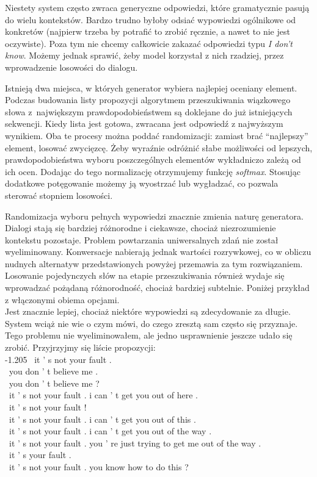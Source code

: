 Niestety system często zwraca generyczne odpowiedzi, które gramatycznie pasują do wielu kontekstów. Bardzo trudno byłoby odsiać wypowiedzi ogólnikowe od konkretów (najpierw trzeba by potrafić to zrobić ręcznie, a nawet to nie jest oczywiste). Poza tym nie chcemy całkowicie zakazać odpowiedzi typu \textit{I don't know}. Możemy jednak sprawić, żeby model korzystał z nich rzadziej, przez wprowadzenie losowości do dialogu.

Istnieją dwa miejsca, w których generator wybiera najlepiej oceniany element. Podczas budowania listy propozycji algorytmem przeszukiwania wiązkowego słowa z~największym prawdopodobieństwem są doklejane do już istniejących sekwencji. Kiedy lista jest gotowa, zwracana jest odpowiedź z najwyższym wynikiem. Oba te procesy można poddać randomizacji: zamiast brać ``najlepszy'' element, losować zwycięzcę. Żeby wyraźnie odróżnić słabe możliwości od lepszych, prawdopodobieństwa wyboru poszczególnych elementów wykładniczo zależą od ich ocen. Dodając do tego normalizację otrzymujemy funkcję \textit{softmax}. Stosując dodatkowe potęgowanie możemy ją wyostrzać lub wygładzać, co pozwala sterować stopniem losowości.

Randomizacja wyboru pełnych wypowiedzi znacznie zmienia naturę generatora. Dialogi stają się bardziej różnorodne i ciekawsze, chociaż niezrozumienie kontekstu pozostaje. Problem powtarzania uniwersalnych zdań nie został wyeliminowany. Konwersacje nabierają jednak wartości rozrywkowej, co w obliczu nudnych alternatyw przedstawionych powyżej przemawia za tym rozwiązaniem. Losowanie pojedynczych słów na etapie przeszukiwania również wydaje się wprowadzać pożądaną różnorodność, chociaż bardziej subtelnie. Poniżej przykład z włączonymi obiema opcjami.\\



Jest znacznie lepiej, chociaż niektóre wypowiedzi są zdecydowanie za długie. System wciąż nie wie o czym mówi, do czego zresztą sam często się przyznaje. Tego problemu nie wyeliminowałem, ale jedno usprawnienie jeszcze udało się zrobić. Przyjrzyjmy się liście propozycji:\\

\small
-1.205 \ it ' s not your fault .\\ \ you don ' t believe me .\\ \ you don ' t believe me ?\\ \ it ' s not your fault . i can ' t get you out of here .\\ \ it ' s not your fault !\\ \ it ' s not your fault . i can ' t get you out of this .\\ \ it ' s not your fault . i can ' t get you out of the way .\\ \ it ' s not your fault . you ' re just trying to get me out of the way .\\ \ it ' s your fault .\\ \ it ' s not your fault . you know how to do this ?\\
\normalsize

